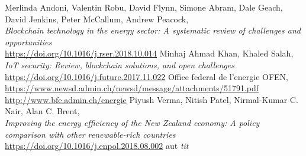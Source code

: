 \documentclass[11pt]{article}
\begin{document}
\begin{thebibliography}{11}
	Merlinda Andoni, Valentin Robu, David Flynn, Simone Abram, Dale Geach,  David Jenkins, Peter McCallum, Andrew Peacock,\\
	\textit{Blockchain technology in the energy sector: A systematic review of challenges and opportunities}\\
	\hyperref[https://doi.org/10.1016/j.rser.2018.10.014]{https://doi.org/10.1016/j.rser.2018.10.014}
	Minhaj Ahmad Khan, Khaled Salah, \\
	\textit{IoT security: Review, blockchain solutions, and open challenges}\\
	\hyperref[https://doi.org/10.1016/j.future.2017.11.022]{https://doi.org/10.1016/j.future.2017.11.022}
	Office federal de l'energie OFEN, \\
	\hyperref[https://www.newsd.admin.ch/newsd/message/attachments/51791.pdf]{https://www.newsd.admin.ch/newsd/message/attachments/51791.pdf}\\
	\hyperref[http://www.bfe.admin.ch/energie]{http://www.bfe.admin.ch/energie}
	Piyush Verma, Nitish Patel, Nirmal-Kumar C. Nair, Alan C. Brent, \\
	\textit{Improving the energy efficiency of the New Zealand economy: A policy comparison with other renewable-rich countries}\\
	\hyperref[https://doi.org/10.1016/j.enpol.2018.08.002]{https://doi.org/10.1016/j.enpol.2018.08.002}
	aut
	\textit{tit}
	\hyperref[]{}


\end{thebibliography}

	
\end{document}
